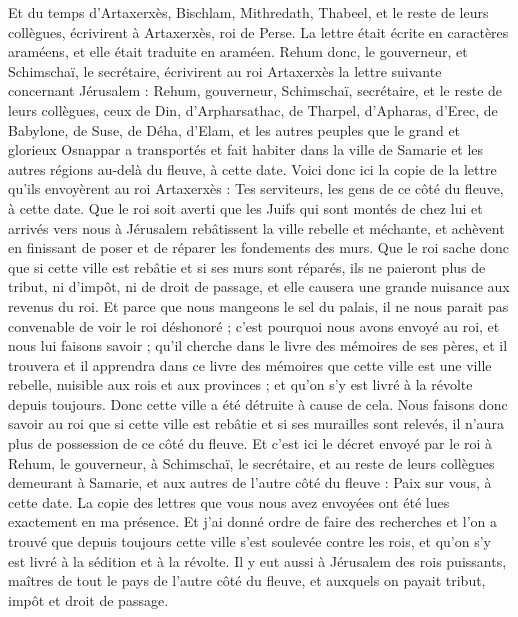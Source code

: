 \begin{multicols}{2}
Et du temps d'Artaxerxès, Bischlam, Mithredath, Thabeel, et le reste de leurs collègues, écrivirent à Artaxerxès, roi de Perse. La lettre était écrite en caractères araméens, et elle était traduite en araméen.
Rehum donc, le gouverneur, et Schimschaï, le secrétaire, écrivirent au roi Artaxerxès la lettre suivante concernant Jérusalem :
Rehum, gouverneur, Schimschaï, secrétaire, et le reste de leurs collègues, ceux de Din, d'Arpharsathac, de Tharpel, d'Apharas, d'Erec, de Babylone, de Suse, de Déha, d'Elam,
et les autres peuples que le grand et glorieux Osnappar a transportés et fait habiter dans la ville de Samarie et les autres régions au-delà du fleuve, à cette date.
Voici donc ici la copie de la lettre qu'ils envoyèrent au roi Artaxerxès : Tes serviteurs, les gens de ce côté du fleuve, à cette date.
Que le roi soit averti que les Juifs qui sont montés de chez lui et arrivés vers nous à Jérusalem rebâtissent la ville rebelle et méchante, et achèvent en finissant de poser et de réparer les fondements des murs.
Que le roi sache donc que si cette ville est rebâtie et si ses murs sont réparés, ils ne paieront plus de tribut, ni d’impôt, ni de droit de passage, et elle causera une grande nuisance aux revenus du roi.
Et parce que nous mangeons le sel du palais, il ne nous parait pas convenable de voir le roi déshonoré ; c’est pourquoi nous avons envoyé au roi, et nous lui faisons savoir ;
qu'il cherche dans le livre des mémoires de ses pères, et il trouvera et il apprendra dans ce livre des mémoires que cette ville est une ville rebelle, nuisible aux rois et aux provinces ; et qu’on s’y est livré à la révolte depuis toujours. Donc cette ville a été détruite à cause de cela.
Nous faisons donc savoir au roi que si cette ville est rebâtie et si ses murailles sont relevés, il n'aura plus de possession de ce côté du fleuve.
Et c'est ici le décret envoyé par le roi à Rehum, le gouverneur, à Schimschaï, le secrétaire, et au reste de leurs collègues demeurant à Samarie, et aux autres de l'autre côté du fleuve : Paix sur vous, à cette date.
La copie des lettres que vous nous avez envoyées ont été lues exactement en ma présence.
Et j'ai donné ordre de faire des recherches et l’on a trouvé que depuis toujours cette ville s'est soulevée contre les rois, et qu'on s’y est livré à la sédition et à la révolte.
Il y eut aussi à Jérusalem des rois puissants, maîtres de tout le pays de l'autre côté du fleuve, et auxquels on payait tribut, impôt et droit de passage.

\end{multicols}

